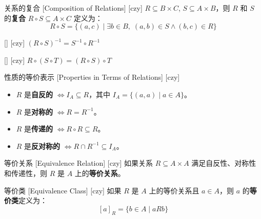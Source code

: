 \documentclass[UTF8]{ctexart}
\begin{document}
        \begin{dfn}
            [UUID]
            {关系的复合}
            [Composition of Relations]
            [czy]
            \( R \subseteq B \times C \), \( S \subseteq A \times B \)，则 \( R \) 和 \( S \) 的\textbf{复合} \( R \circ S \subseteq A \times C \) 定义为：
            \[
            R \circ S = \{ (a, c) \mid \exists b \in B, \; (a, b) \in S \land (b, c) \in R \}
            \]
        \end{dfn}

        \begin{ppt}
            [UUID]
            {}
            []
            [czy]
            \( (R \circ S)^{-1} = S^{-1} \circ R^{-1} \)
        \end{ppt}

        \begin{ppt}
            [UUID]
            {}
            []
            [czy]
            \( R \circ (S \circ T) = (R \circ S) \circ T \)
        \end{ppt}

        \begin{ppt}
            [UUID]
            {性质的等价表示}
            [Properties in Terms of Relations]
            [czy]
            \begin{itemize}
                \item \( R \) 是\textbf{自反的} \( \iff I_A \subseteq R \)，其中 \( I_A = \{ (a, a) \mid a \in A \} \)。
                \item \( R \) 是\textbf{对称的} \( \iff R = R^{-1} \)。
                \item \( R \) 是\textbf{传递的} \( \iff R \circ R \subseteq R \)。
                \item \( R \) 是\textbf{反对称的} \( \iff R \cap R^{-1} \subseteq I_A \)。
            \end{itemize}
        \end{ppt}


        \begin{dfn}
            [UUID]
            {等价关系}
            [Equivalence Relation]
            [czy]
            如果关系 \( R \subseteq A \times A \) 满足自反性、对称性和传递性，则 \( R \) 是 \( A \) 上的\textbf{等价关系}。
        \end{dfn}

        \begin{dfn}
            [UUID]
            {等价类}
            [Equivalence Class]
            [czy]
            如果 \( R \) 是 \( A \) 上的等价关系且 \( a \in A \)，则 \( a \) 的\textbf{等价类}定义为：
            \[
            [a]_R = \{ b \in A \mid a R b \}
            \]
        \end{dfn}
\end{document}
